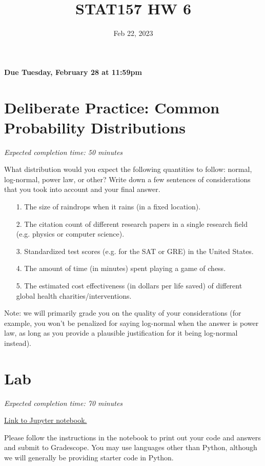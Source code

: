 \documentclass[11pt]{article}
\title{STAT157 HW 6}
\date{Feb 22, 2023}
\begin{document}
\maketitle

\hfill \textbf{Due Tuesday, February 28 at 11:59pm}

\section*{Deliberate Practice: Common Probability Distributions}

\emph{Expected completion time: 50 minutes}

What distribution would you expect the following quantities to follow: normal, log-normal, power law, or other? Write down a few sentences of considerations that you took into account and your final answer. 

\begin{enumerate}
	\item[1.] The size of raindrops when it rains (in a fixed location).
	\item[2.] The citation count of different research papers in a single research field (e.g. physics or computer science).
	\item[3.] Standardized test scores (e.g. for the SAT or GRE) in the United States.
	\item[4.] The amount of time (in minutes) spent playing a game of chess.
	\item[5.] The estimated cost effectiveness (in dollars per life saved) of different global health charities/interventions.
\end{enumerate}

Note: we will primarily grade you on the quality of your considerations (for example, you won't be penalized for saying log-normal when the answer is power law, as long as you provide a plausible justification for it being log-normal instead).

\section*{Lab}

\emph{Expected completion time: 70 minutes}

\href{http://datahub.berkeley.edu/hub/user-redirect/git-pull?repo=https%3A%2F%2Fgithub.com%2Fjs-d%2Fforecasting-class-sp23&urlpath=tree%2Fforecasting-class-sp23%2Fhw%2Fhw6%2Fhw6lab.ipynb&branch=main}{Link to Jupyter notebook.}

Please follow the instructions in the notebook to print out your code and answers and submit to Gradescope. You may use languages other than Python, although we will generally be providing starter code in Python.
\end{document}
